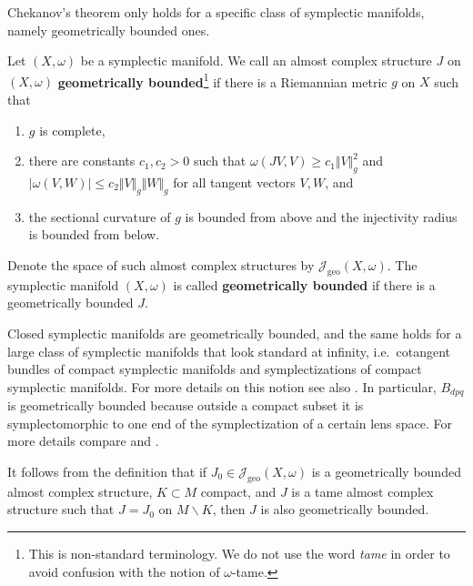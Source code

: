 \documentclass[12pt,a4paper,draft]{scrartcl}
\begin{document}
Chekanov's theorem only holds for a specific class of symplectic manifolds, namely geometrically bounded ones.

\begin{definition}
    \label{def:geobdd}
    Let $(X,\omega)$ be a symplectic manifold.
We call an almost complex structure $J$ on $(X,\omega)$ \textbf{geometrically bounded}\footnote{This is non-standard terminology.
We do not use the word \textit{tame} in order to avoid confusion with the notion of $\omega$-tame.} if there is a Riemannian metric $g$ on $X$ such that 
    \begin{enumerate}
        \item $g$ is complete,
        \item there are constants $c_1,c_2 > 0$ such that $\omega(JV,V) ≥ c_1 \Vert V \Vert_g^2$ and $\vert \omega(V,W) \vert ≤ c_2 \Vert V \Vert_g \Vert W \Vert_g$ for all tangent vectors $V,W$, and
        \item the sectional curvature of $g$ is bounded from above and the injectivity radius is bounded from below.
    \end{enumerate}
    Denote the space of such almost complex structures by $\mathcal{J}_{\text{geo}}(X,\omega)$.
    The symplectic manifold $(X,\omega)$ is called \textbf{geometrically bounded} if there is a geometrically bounded $J$. 
\end{definition}

\begin{remark}
  \label{rem:Bdpq_geometrically_bounded}
    Closed symplectic manifolds are geometrically bounded, and the same holds for a large class of symplectic manifolds that look standard at infinity, i.e.\ cotangent bundles of compact symplectic manifolds and symplectizations of compact symplectic manifolds.
For more details on this notion see also \cite[Chapter X, Definition 2.2.1]{AudLaf94}.
In particular, $B_{dpq}$ is geometrically bounded because outside a compact subset it is symplectomorphic to one end of the symplectization of a certain lens space.
For more details compare \cite{Eva19} and \cite{evans2021atfs}.
\end{remark}

\begin{remark}
  \label{rem:J_compactly_perturbed}
  It follows from the definition that if $J_0 \in \mathcal{J}_\text{geo}(X,ω)$ is a geometrically bounded almost complex structure, $K ⊂ M$ compact, and $J$ is a tame almost complex structure such that $J = J_0$ on $M ∖ K$, then $J$ is also geometrically bounded.
\end{remark}
\end{document}
